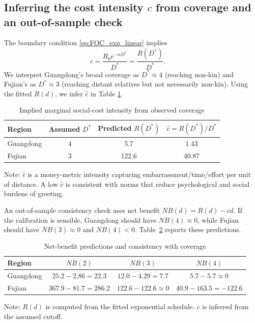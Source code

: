 \documentclass[AER]{AEA}
\begin{document}
\subsection{Inferring the cost intensity $c$ from coverage and an out-of-sample check}
The boundary condition \eqref{eq:FOC_exp_linear} implies
\[
c=\frac{R_0 e^{-\alpha D^*}}{D^*}=\frac{R(D^*)}{D^*}.
\]
We interpret Guangdong's broad coverage as $D^*\approx 4$ (reaching non-kin) and Fujian's as $D^*\approx 3$ (reaching distant relatives but not necessarily non-kin). Using the fitted $R(d)$, we infer $\widehat{c}$ in Table \ref{tab:cali}.

\begin{table}[h]
\centering
\caption{Implied marginal social-cost intensity from observed coverage}
\label{tab:cali}
\begin{tabular}{lccc}
\toprule
Region & Assumed $D^*$ & Predicted $R(D^*)$ & $\widehat{c}=R(D^*)/D^*$ \\
\midrule
Guangdong & 4 & 5.7 & 1.43 \\
Fujian    & 3 & 122.6 & 40.87 \\
\bottomrule
\end{tabular}
\begin{tablenotes}
Note: $\widehat{c}$ is a money-metric intensity capturing embarrassment/time/effort per unit of distance. A low $\widehat{c}$ is consistent with norms that reduce psychological and social burdens of greeting.
\end{tablenotes}
\end{table}

An out-of-sample consistency check uses net benefit $NB(d)=R(d)-cd$. If the calibration is sensible, Guangdong should have $NB(4)\approx 0$, while Fujian should have $NB(3)\approx 0$ and $NB(4)<0$. Table~\ref{tab:nb} reports these predictions.

\begin{table}[h]
\centering
\caption{Net-benefit predictions and consistency with coverage}
\label{tab:nb}
\begin{tabular}{lccc}
\toprule
Region & $NB(2)$ & $NB(3)$ & $NB(4)$ \\
\midrule
Guangdong & $25.2-2.86=22.3$ & $12.0-4.29=7.7$ & $5.7-5.7\approx 0$ \\
Fujian    & $367.9-81.7=286.2$ & $122.6-122.6\approx 0$ & $40.9-163.5=-122.6$ \\
\bottomrule
\end{tabular}
\begin{tablenotes}
Note: $R(d)$ is computed from the fitted exponential schedule. $c$ is inferred from the assumed cutoff.
\end{tablenotes}
\end{table}
\end{document}
